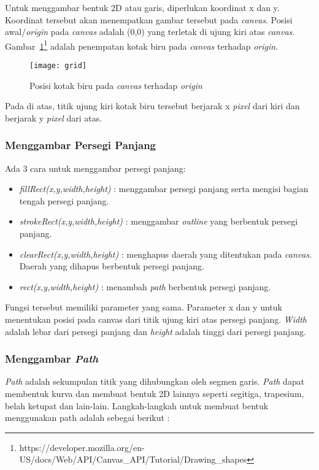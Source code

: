 Untuk menggambar bentuk 2D atau garis, diperlukan koordinat x dan y. Koordinat tersebut akan menempatkan gambar tersebut pada \textit{canvas}. Posisi awal/\textit{origin} pada \textit{canvas} adalah (0,0) yang terletak di ujung kiri atas \textit{canvas}. Gambar~\ref{fig:grid}\footnote{https://developer.mozilla.org/en-US/docs/Web/API/Canvas\_API/Tutorial/Drawing\_shapes} adalah penempatan kotak biru pada \textit{canvas} terhadap \textit{origin}.

\begin{figure}[H]
	\centering  
	\texttt{[image: grid]}
	\caption[Posisi kotak biru pada \textit{canvas} terhadap \textit{origin}]{Posisi kotak biru pada \textit{canvas} terhadap \textit{origin}}
	\label{fig:grid} 
\end{figure} 

Pada di atas, titik ujung kiri kotak biru tersebut berjarak x \textit{pixel} dari kiri dan berjarak y \textit{pixel} dari atas. 

\subsubsection{Menggambar Persegi Panjang}
Ada 3 cara untuk menggambar persegi panjang:

\begin{itemize}
	\item \textit{fillRect(x,y,width,height)} : menggambar persegi panjang serta mengisi bagian tengah persegi panjang.
	\item \textit{strokeRect(x,y,width,height)} : menggambar \textit{outline} yang berbentuk persegi panjang.
	\item \textit{clearRect(x,y,width,height)} : menghapus daerah yang ditentukan pada \textit{canvas}. Daerah yang dihapus berbentuk persegi panjang.
	\item \textit{rect(x,y,width,height)} : menambah \textit{path} berbentuk persegi panjang.
\end{itemize}

Fungsi tersebut memiliki parameter yang sama. Parameter x dan y untuk menentukan posisi pada canvas dari titik ujung kiri atas persegi panjang. \textit{Width} adalah lebar dari persegi panjang dan \textit{height} adalah tinggi dari persegi panjang.

\subsubsection{Menggambar \textit{Path}}
\textit{Path} adalah sekumpulan titik yang dihubungkan oleh segmen garis. \textit{Path} dapat membentuk kurva dan membuat bentuk 2D lainnya seperti segitiga, trapesium, belah ketupat dan lain-lain. Langkah-langkah untuk membuat bentuk menggunakan path adalah sebegai berikut : 

